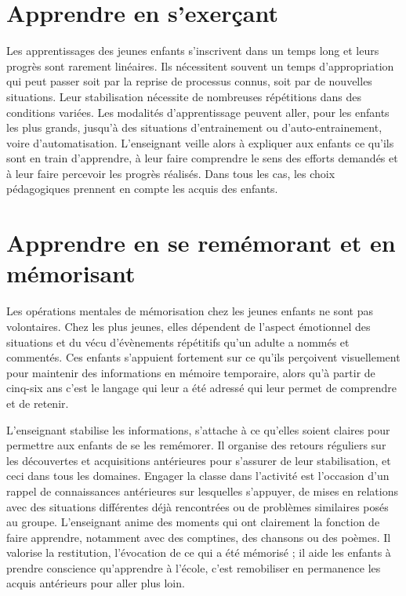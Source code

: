 \section{Apprendre en s’exerçant}
Les apprentissages des jeunes enfants s’inscrivent dans un temps long et leurs progrès sont rarement linéaires. Ils nécessitent souvent un temps d’appropriation qui peut passer soit par la reprise de processus connus, soit par de nouvelles situations. Leur stabilisation nécessite de nombreuses répétitions dans des conditions variées. Les modalités d’apprentissage peuvent aller, pour les enfants les plus grands, jusqu’à des situations d’entrainement ou d’auto-entrainement, voire d’automatisation. L’enseignant veille alors à expliquer aux enfants ce qu’ils sont en train d’apprendre, à leur faire comprendre le sens des efforts demandés et à leur faire percevoir les progrès réalisés. Dans tous les cas, les choix pédagogiques prennent en compte les acquis des enfants.

\section{Apprendre en se remémorant et en mémorisant}
Les opérations mentales de mémorisation chez les jeunes enfants ne sont pas volontaires. Chez les plus jeunes, elles dépendent de l’aspect émotionnel des situations et du vécu d’évènements répétitifs qu’un adulte a nommés et commentés. Ces enfants s’appuient fortement sur ce qu’ils perçoivent visuellement pour maintenir des informations en mémoire temporaire, alors qu’à partir de cinq-six ans c’est le langage qui leur a été adressé qui leur permet de comprendre et de retenir. 

L’enseignant stabilise les informations, s’attache à ce qu’elles soient claires pour permettre aux enfants de se les remémorer. Il organise des retours réguliers sur les découvertes et acquisitions antérieures pour s’assurer de leur stabilisation, et ceci dans tous les domaines. Engager la classe dans l’activité est l’occasion d’un rappel de connaissances antérieures sur lesquelles s'appuyer, de mises en relations avec des situations différentes déjà rencontrées ou de problèmes similaires posés au groupe. L’enseignant anime des moments qui ont clairement la fonction de faire apprendre, notamment avec des comptines, des chansons ou des poèmes. Il valorise la restitution, l’évocation de ce qui a été mémorisé ; il aide les enfants à prendre conscience qu’apprendre à l’école, c’est remobiliser en permanence les acquis antérieurs pour aller plus loin.       

